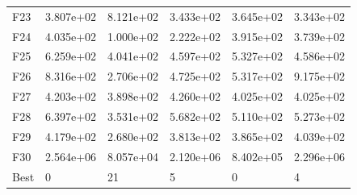 \begin{tabular}{llllll}
F23  &  3.807e+02 &  8.121e+02 &  3.433e+02 &  3.645e+02 &  3.343e+02 \\
F24  &  4.035e+02 &  1.000e+02 &  2.222e+02 &  3.915e+02 &  3.739e+02 \\
F25  &  6.259e+02 &  4.041e+02 &  4.597e+02 &  5.327e+02 &  4.586e+02 \\
F26  &  8.316e+02 &  2.706e+02 &  4.725e+02 &  5.317e+02 &  9.175e+02 \\
F27  &  4.203e+02 &  3.898e+02 &  4.260e+02 &  4.025e+02 &  4.025e+02 \\
F28  &  6.397e+02 &  3.531e+02 &  5.682e+02 &  5.110e+02 &  5.273e+02 \\
F29  &  4.179e+02 &  2.680e+02 &  3.813e+02 &  3.865e+02 &  4.039e+02 \\
F30  &  2.564e+06 &  8.057e+04 &  2.120e+06 &  8.402e+05 &  2.296e+06 \\
Best &          0 &         21 &          5 &          0 &          4 \\
\bottomrule
\end{tabular}
